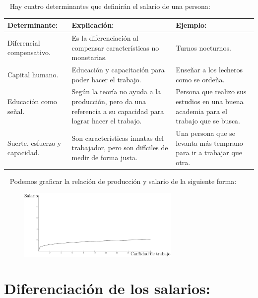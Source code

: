\documentclass[
  letterpaper,
  DIV=11,
  numbers=noendperiod]{scrreport}
\begin{document}
~ Hay cuatro determinantes que definirán el salario de una persona:

\begin{table}[h]
    \centering
    \begin{tabular}{|p{40mm}|p{40mm}|p{40mm}|}
        \hline
        Determinante: & Explicación: & Ejemplo: \\ \hline
    Diferencial compensativo. & Es la diferenciación al compensar características no monetarias. & Turnos nocturnos. \\ \hline
    Capital humano. & Educación y capacitación para poder hacer el trabajo. & Enseñar a los lecheros como se ordeña. \\ \hline
    Educación como señal. & Según la teoría no ayuda a la producción, pero da una referencia a su capacidad para lograr hacer el trabajo. & Persona que realizo sus estudios en una buena academia para el trabajo que se busca. \\ \hline
    Suerte, esfuerzo y capacidad. & Son características innatas del trabajador, pero son difíciles de medir de forma justa. & Una persona que se levanta más temprano para ir a trabajar que otra. \\ \hline
    \end{tabular}
    
\end{table}

~ Podemos graficar la relación de producción y salario de la siguiente
forma:

\begin{figure}

{\centering \includegraphics[width=0.7\textwidth,height=\textheight]{4sistimpo_files/figure-pdf/unnamed-chunk-4-1.pdf}

}

\end{figure}

\hypertarget{diferenciaciuxf3n-de-los-salarios}{%
\section{Diferenciación de los
salarios:}\label{diferenciaciuxf3n-de-los-salarios}}
\end{document}
